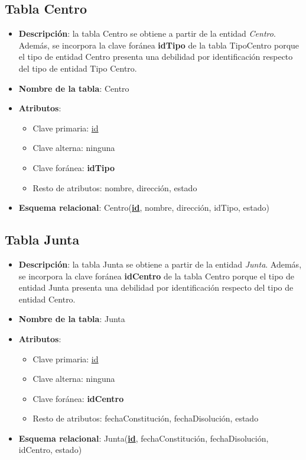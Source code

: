 \subsection{Tabla Centro}
    \begin{itemize}
        \item \textbf{Descripción}: la tabla Centro se obtiene a partir de la entidad \textit{Centro}. Además, se incorpora la clave foránea \textbf{idTipo} de la tabla TipoCentro porque el tipo de entidad Centro presenta una debilidad por identificación respecto del tipo de entidad Tipo Centro.
        \item \textbf{Nombre de la tabla}: Centro
        \item \textbf{Atributos}:
            \begin{itemize}
                \item Clave primaria: \underline{id}
                \item Clave alterna: ninguna
                \item Clave foránea: \textbf{idTipo}
                \item Resto de atributos: nombre, dirección, estado
            \end{itemize}
        \item \textbf{Esquema relacional}: 
            Centro(\textbf{\underline{id}}, nombre, dirección, idTipo, estado)
    \end{itemize}

\subsection{Tabla Junta}
    \begin{itemize}
        \item \textbf{Descripción}: la tabla Junta se obtiene a partir de la entidad \textit{Junta}. Además, se incorpora la clave foránea \textbf{idCentro} de la tabla Centro porque el tipo de entidad Junta presenta una debilidad por identificación respecto del tipo de entidad Centro.
        \item \textbf{Nombre de la tabla}: Junta
        \item \textbf{Atributos}:
            \begin{itemize}
                \item Clave primaria: \underline{id}
                \item Clave alterna: ninguna
                \item Clave foránea: \textbf{idCentro}
                \item Resto de atributos: fechaConstitución, fechaDisolución, estado
            \end{itemize}
        \item \textbf{Esquema relacional}: 
            Junta(\textbf{\underline{id}}, fechaConstitución, fechaDisolución, idCentro, estado)
    \end{itemize}

